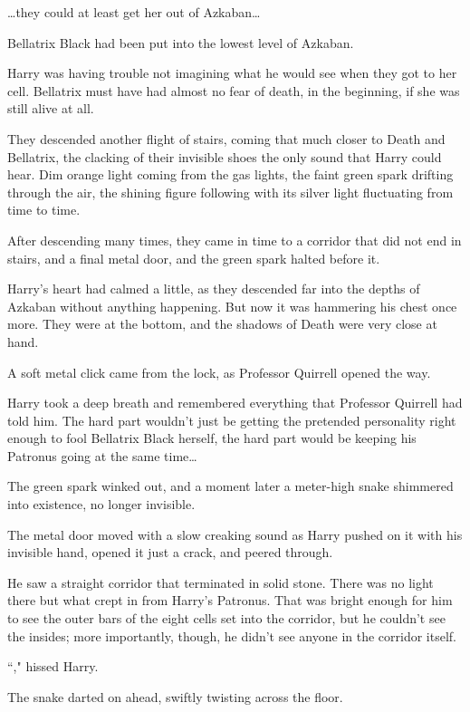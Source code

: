 {\ldots}they could at least get her out of Azkaban{\ldots}

Bellatrix Black had been put into the lowest level of Azkaban.

Harry was having trouble not imagining what he would see when they got to her cell. Bellatrix must have had almost no fear of death, in the beginning, if she was still alive at all.

They descended another flight of stairs, coming that much closer to Death and Bellatrix, the clacking of their invisible shoes the only sound that Harry could hear. Dim orange light coming from the gas lights, the faint green spark drifting through the air, the shining figure following with its silver light fluctuating from time to time.

\later

After descending many times, they came in time to a corridor that did not end in stairs, and a final metal door, and the green spark halted before it.

Harry's heart had calmed a little, as they descended far into the depths of Azkaban without anything happening. But now it was hammering his chest once more. They were at the bottom, and the shadows of Death were very close at hand.

A soft metal click came from the lock, as Professor Quirrell opened the way.

Harry took a deep breath and remembered everything that Professor Quirrell had told him. The hard part wouldn't just be getting the pretended personality right enough to fool Bellatrix Black herself, the hard part would be keeping his Patronus going at the same time{\ldots}

The green spark winked out, and a moment later a meter-high snake shimmered into existence, no longer invisible.

The metal door moved with a slow creaking sound as Harry pushed on it with his invisible hand, opened it just a crack, and peered through.

He saw a straight corridor that terminated in solid stone. There was no light there but what crept in from Harry's Patronus. That was bright enough for him to see the outer bars of the eight cells set into the corridor, but he couldn't see the insides; more importantly, though, he didn't see anyone in the corridor itself.

``," hissed Harry.

The snake darted on ahead, swiftly twisting across the floor.

